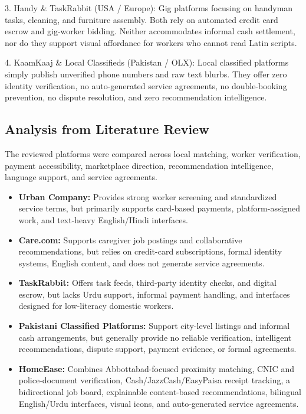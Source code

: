 \documentclass[12pt,a4paper]{article}
\begin{document}
3. Handy \& TaskRabbit (USA / Europe): Gig platforms focusing on handyman tasks, cleaning, and furniture assembly. Both rely on automated credit card escrow and gig-worker bidding. Neither accommodates informal cash settlement, nor do they support visual affordance for workers who cannot read Latin scripts.

4. KaamKaaj \& Local Classifieds (Pakistan / OLX): Local classified platforms simply publish unverified phone numbers and raw text blurbs. They offer zero identity verification, no auto-generated service agreements, no double-booking prevention, no dispute resolution, and zero recommendation intelligence.

\subsection{Analysis from Literature Review}
The reviewed platforms were compared across local matching, worker verification, payment accessibility, marketplace direction, recommendation intelligence, language support, and service agreements.

\begin{itemize}[leftmargin=*,itemsep=6pt]
\item \textbf{Urban Company:} Provides strong worker screening and standardized service terms, but primarily supports card-based payments, platform-assigned work, and text-heavy English/Hindi interfaces.
\item \textbf{Care.com:} Supports caregiver job postings and collaborative recommendations, but relies on credit-card subscriptions, formal identity systems, English content, and does not generate service agreements.
\item \textbf{TaskRabbit:} Offers task feeds, third-party identity checks, and digital escrow, but lacks Urdu support, informal payment handling, and interfaces designed for low-literacy domestic workers.
\item \textbf{Pakistani Classified Platforms:} Support city-level listings and informal cash arrangements, but generally provide no reliable verification, intelligent recommendations, dispute support, payment evidence, or formal agreements.
\item \textbf{HomeEase:} Combines Abbottabad-focused proximity matching, CNIC and police-document verification, Cash/JazzCash/EasyPaisa receipt tracking, a bidirectional job board, explainable content-based recommendations, bilingual English/Urdu interfaces, visual icons, and auto-generated service agreements.
\end{itemize}
\end{document}

